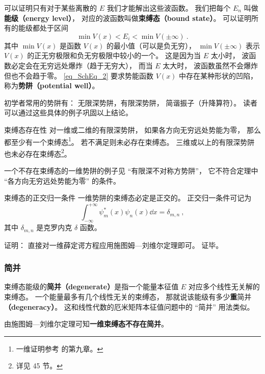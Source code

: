 可以证明只有对于某些离散的 $E$ 我们才能解出这些波函数。 我们把每个 $E_n$ 叫做\textbf{能级（energy level）}， 对应的波函数叫做\textbf{束缚态（bound state）}。 可以证明所有的能级都处于区间
\begin{equation}\label{eq_SchEq_2}
\min V(x) < E_i < \min V(\pm\infty)~.
\end{equation}
其中 $\min V(x)$ 是函数 $V(x)$ 的最小值（可以是负无穷）， $\min V(\pm\infty)$ 表示 $V(x)$ 的正无穷极限和负无穷极限中较小的一个。 这是因为当 $E$ 太小时， 波函数必定会在无穷远处爆炸（趋于无穷大）， 而当 $E$ 太大时， 波函数虽然不会爆炸但也不会趋于零。 \autoref{eq_SchEq_2} 要求势能函数 $V(x)$ 中存在某种形状的凹陷， 称为\textbf{势阱（potential well）}。

初学者常用的势阱有： 无限深势阱，有限深势阱， 简谐振子（升降算符）。 读者可以通过这些具体的例子巩固以上结论。

\begin{theorem}{束缚态存在性}
对一维或二维的有限深势阱， 如果各方向无穷远处势能为零， 那么都至少有一个束缚态\footnote{一维证明参考 \cite{Teschl} 的第九章。}。 若不满足则未必存在束缚态。 三维或以上的有限深势阱也未必存在束缚态\footnote{详见 \cite{Landau} 45 节。}。
\end{theorem}
一个不存在束缚态的一维势阱的例子见 “有限深不对称方势阱”， 它不符合定理中 “各方向无穷远处势能为零” 的条件。

\begin{theorem}{束缚态的正交归一条件}
一维势阱的束缚态必定是正交的。 正交归一条件可记为
\begin{equation}
\int_{-\infty}^{+\infty} \psi^*_m(x) \psi_n(x)\dd{x} = \delta_{m,n}~,
\end{equation}
其中 $\delta_{m,n}$ 是克罗内克 $\delta$ 函数。
\end{theorem}
证明： 直接对一维薛定谔方程应用施图姆—刘维尔定理即可。 证毕。

\subsubsection{简并}
束缚态能级的\textbf{简并（degenerate）}是指一个能量本征值 $E$ 对应多个线性无关解的束缚态。 一个能量最多有几个线性无关的束缚态， 那就说该能级有多少\textbf{重}简并\textbf{（degeneracy）}。 这和线性代数的厄米矩阵本征值问题中的 “简并” 用法类似。

由施图姆—刘维尔定理可知\textbf{一维束缚态不存在简并}。

